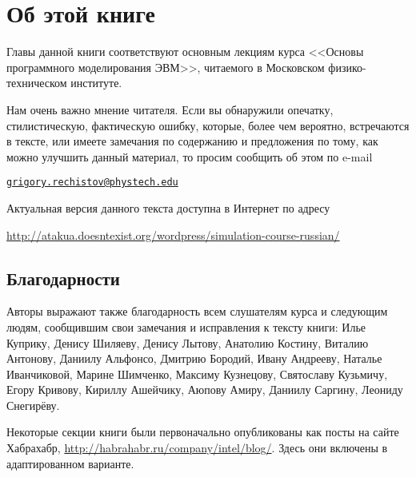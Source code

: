 \chapter*{Об этой книге}\label{chap:contrib}

Главы данной книги соответствуют основным лекциям курса <<Основы программного моделирования ЭВМ>>, читаемого в Московском физико-техническом институте.

Нам очень важно мнение читателя. Если вы обнаружили опечатку, стилистическую, фактическую ошибку, которые, более чем вероятно, встречаются в тексте, или имеете замечания по содержанию и предложения по тому, как можно улучшить данный материал, то просим сообщить об этом по e-mail 

\begin{center}
\href{mailto:grigory.rechistov@phystech.edu}{\texttt{grigory.rechistov@phystech.edu}}
\end{center}




Актуальная версия данного текста доступна в Интернет по адресу

\url{http://atakua.doesntexist.org/wordpress/simulation-course-russian/}

\section*{Благодарности}

Авторы выражают также благодарность всем слушателям курса и следующим людям, сообщившим свои замечания и исправления к тексту книги: Илье Куприку, Денису Шиляеву, Денису Лытову, Анатолию Костину, Виталию Антонову, Даниилу Альфонсо, Дмитрию Бородий, Ивану Андрееву, Наталье Иванчиковой, Марине Шимченко, Максиму Кузнецову, Святославу Кузьмичу, Егору Кривову, Кириллу Ашейчику, Аюпову Амиру, Даниилу Саргину, Леониду Снегирёву.

Некоторые секции книги были первоначально опубликованы как посты на сайте Хабрахабр, \url{http://habrahabr.ru/company/intel/blog/}. Здесь они включены в адаптированном варианте.


